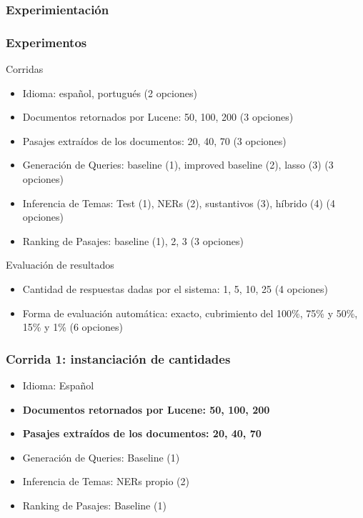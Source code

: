 \subsubsection*{Experimientación}
\begin{frame}
\frametitle{Experimentos}
Corridas
\begin{itemize}
  \item Idioma: español, portugués (2 opciones)
  \item Documentos retornados por Lucene: 50, 100, 200 (3 opciones)
  \item Pasajes extraídos de los documentos: 20, 40, 70 (3 opciones)
  \item Generación de Queries: baseline (1), improved baseline (2), lasso (3) (3 opciones)
  \item Inferencia de Temas: Test (1), NERs (2), sustantivos (3), híbrido (4) (4 opciones)
  \item Ranking de Pasajes: baseline (1), 2, 3 (3 opciones)
\end{itemize}

Evaluación de resultados
\begin{itemize}
  \item Cantidad de respuestas dadas por el sistema: 1, 5, 10, 25 (4 opciones)
  \item Forma de evaluación automática: exacto, cubrimiento del 100\%, 75\% y 50\%, 15\%  y 1\% (6 opciones)
\end{itemize}
\end{frame}

\begin{frame}
\frametitle{Corrida 1: instanciación de cantidades}

\begin{itemize}
  \item Idioma: Español
  \item \textbf{{\color{blue}Documentos retornados por Lucene: 50, 100, 200}}
  \item \textbf{{\color{blue} Pasajes extraídos de los documentos: 20, 40, 70}}
  \item Generación de Queries: Baseline (1)
  \item Inferencia de Temas: NERs propio (2)
  \item Ranking de Pasajes: Baseline (1)
\end{itemize}

\end{frame}

